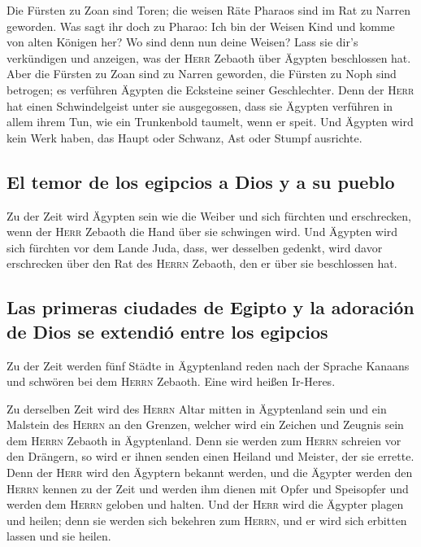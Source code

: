  Die Fürsten zu Zoan sind Toren; die weisen Räte Pharaos
sind im Rat zu Narren geworden. Was sagt ihr doch zu Pharao: Ich bin der
Weisen Kind und komme von alten Königen her?  Wo sind
denn nun deine Weisen? Lass sie dir's verkündigen und anzeigen, was der
\textsc{Herr} Zebaoth über Ägypten beschlossen hat.  Aber
die Fürsten zu Zoan sind zu Narren geworden, die Fürsten zu Noph sind
betrogen; es verführen Ägypten die Ecksteine seiner Geschlechter.
 Denn der \textsc{Herr} hat einen Schwindelgeist unter
sie ausgegossen, dass sie Ägypten verführen in allem ihrem Tun, wie ein
Trunkenbold taumelt, wenn er speit.  Und Ägypten wird
kein Werk haben, das Haupt oder Schwanz, Ast oder Stumpf ausrichte.

\hypertarget{el-temor-de-los-egipcios-a-dios-y-a-su-pueblo}{%
\subsection{El temor de los egipcios a Dios y a su
pueblo}\label{el-temor-de-los-egipcios-a-dios-y-a-su-pueblo}}

 Zu der Zeit wird Ägypten sein wie die Weiber und sich
fürchten und erschrecken, wenn der \textsc{Herr} Zebaoth die Hand über
sie schwingen wird.  Und Ägypten wird sich fürchten vor
dem Lande Juda, dass, wer desselben gedenkt, wird davor erschrecken über
den Rat des \textsc{Herrn} Zebaoth, den er über sie beschlossen hat.

\hypertarget{las-primeras-ciudades-de-egipto-y-la-adoraciuxf3n-de-dios-se-extendiuxf3-entre-los-egipcios}{%
\subsection{Las primeras ciudades de Egipto y la adoración de Dios se
extendió entre los
egipcios}\label{las-primeras-ciudades-de-egipto-y-la-adoraciuxf3n-de-dios-se-extendiuxf3-entre-los-egipcios}}

 Zu der Zeit werden fünf Städte in Ägyptenland reden nach
der Sprache Kanaans und schwören bei dem \textsc{Herrn} Zebaoth. Eine
wird heißen Ir-Heres.

 Zu derselben Zeit wird des \textsc{Herrn} Altar mitten
in Ägyptenland sein und ein Malstein des \textsc{Herrn} an den Grenzen,
 welcher wird ein Zeichen und Zeugnis sein dem
\textsc{Herrn} Zebaoth in Ägyptenland. Denn sie werden zum
\textsc{Herrn} schreien vor den Drängern, so wird er ihnen senden einen
Heiland und Meister, der sie errette.  Denn der
\textsc{Herr} wird den Ägyptern bekannt werden, und die Ägypter werden
den \textsc{Herrn} kennen zu der Zeit und werden ihm dienen mit Opfer
und Speisopfer und werden dem \textsc{Herrn} geloben und halten.
 Und der \textsc{Herr} wird die Ägypter plagen und
heilen; denn sie werden sich bekehren zum \textsc{Herrn}, und er wird
sich erbitten lassen und sie heilen.


